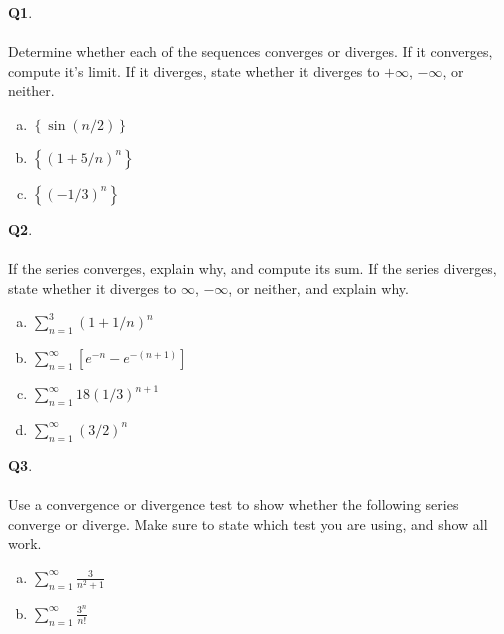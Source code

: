 \documentclass[12pt, oneside]{amsart}
\begin{document}
\vfill


\newpage
\noindent
\textbf{Q1}.\\ \\ Determine whether each of the sequences converges or diverges. If it converges, compute it's limit. If it diverges, state whether it diverges to $+\infty$, $-\infty$, or neither. \\

\begin{enumerate}[a)]
   \item
     $\left\{ \sin(n/2) \right\}$
     \vspace{6cm}
  \item
     $ \left\{ (1 + 5/n)^{n} \right\}$
     \vspace{6cm}
   \item
     $\left\{ (-1/3)^{n}\right\}$
   \end{enumerate}
\newpage
\noindent
\textbf{Q2}. \\ \\ If the series converges, explain why, and compute its sum. If the series diverges, state whether it diverges to $\infty$, $-\infty$, or neither, and explain why.

\begin{enumerate}[a)]
  \item
    $\displaystyle{\sum_{n=1}^{3} (1 + 1/n)^{n}}$
\vspace{6cm}
\item
  $\sum_{n=1}^{\infty} [e^{-n} - e^{-(n+1)}]$
  \newpage
   \item
     $\sum_{n=1}^{\infty} 18 \displaystyle{(1/3)^{n+1}}$
     \vspace{6cm}
   \item $\sum_{n=1}^{\infty} \displaystyle{(3/2)^{n}}$
\end{enumerate}
\newpage
\noindent
\textbf{Q3}. \\ \\ Use a convergence or divergence test to show whether the following series converge or diverge. Make sure to state which test you are using, and show all work. 
\begin{enumerate}[a)]
  \item
$\displaystyle{\sum_{n=1}^{\infty} \frac{3}{n^{2} + 1}}$
    \vspace{6cm}
\item
  $ \displaystyle{\sum_{n=1}^{\infty} \frac{3^{n}}{n!}}$
  \end{enumerate}
\end{document}
